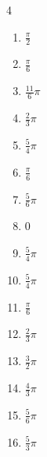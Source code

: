 \begin{multicols}{4}
\begin{enumerate}
  \item $\displaystyle \frac{\pi}{2}$

  \item $\displaystyle \frac{\pi}{6}$

  \item $\displaystyle \frac{11}{6}\pi$

  \item $\displaystyle \frac{2}{3}\pi$

  \item $\displaystyle \frac{5}{4}\pi$

  \item $\displaystyle \frac{\pi}{6}$

  \item $\displaystyle \frac{5}{6}\pi$

  \item $\displaystyle 0$

  \item $\displaystyle \frac{5}{4}\pi$

  \item $\displaystyle \frac{5}{4}\pi$

  \item $\displaystyle \frac{\pi}{6}$

  \item $\displaystyle \frac{2}{3}\pi$

  \item $\displaystyle \frac{3}{2}\pi$

  \item $\displaystyle \frac{4}{3}\pi$

  \item $\displaystyle \frac{5}{6}\pi$

  \item $\displaystyle \frac{5}{3}\pi$


\end{enumerate}
\end{multicols}
